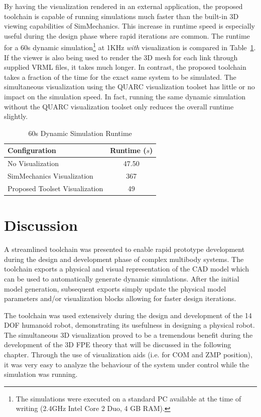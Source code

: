 By having the visualization rendered in an external application, the proposed toolchain is capable of running simulations much faster than the built-in 3D viewing capabilities of SimMechanics. This increase in runtime speed is especially useful during the design phase where rapid iterations are common. The runtime for a 60s dynamic simulation\footnote{The simulations were executed on a standard PC available at the time of writing (2.4GHz Intel Core 2 Duo, 4 GB RAM).} at 1KHz \emph{with} visualization is compared in Table~\ref{tab:benchmark}. If the viewer is also being used to render the 3D mesh for each link through supplied VRML files, it takes much longer. In contrast, the proposed toolchain takes a fraction of the time for the exact same system to be simulated. The simultaneous visualization using the QUARC visualization toolset has little or no impact on the simulation speed. In fact, running the same dynamic simulation without the QUARC visualization toolset only reduces the overall runtime slightly.

\begin{table}[!h]
  \centering
  \caption{60s Dynamic Simulation Runtime}
    \begin{tabular}{lc}
    \addlinespace
    \toprule
    \textbf{Configuration} & \textbf{Runtime ($s$)}\\
    \midrule
    No Visualization 				& 47.50 	\\
    SimMechanics Visualization    	& 367	 	\\
    Proposed Toolset Visualization 	& 49 		\\
    \bottomrule
    \end{tabular}
  \label{tab:benchmark}
\end{table}



\section{Discussion} %
\label{sec:toolchain_discussion}
A streamlined toolchain was presented to enable rapid prototype development during the design and development phase of complex multibody systems. The toolchain exports a physical and visual representation of the CAD model which can be used to automatically generate dynamic simulations. After the initial model generation, subsequent exports simply update the physical model parameters and/or visualization blocks allowing for faster design iterations. 

The toolchain was used extensively during the design and development of the 14 DOF humanoid robot, demonstrating its usefulness in designing a physical robot. The simultaneous 3D visualization proved to be a tremendous benefit during the development of the 3D FPE theory that will be discussed in the following chapter. Through the use of visualization aids (i.e. for COM and ZMP position), it was very easy to analyze the behaviour of the system under control while the simulation was running. 


